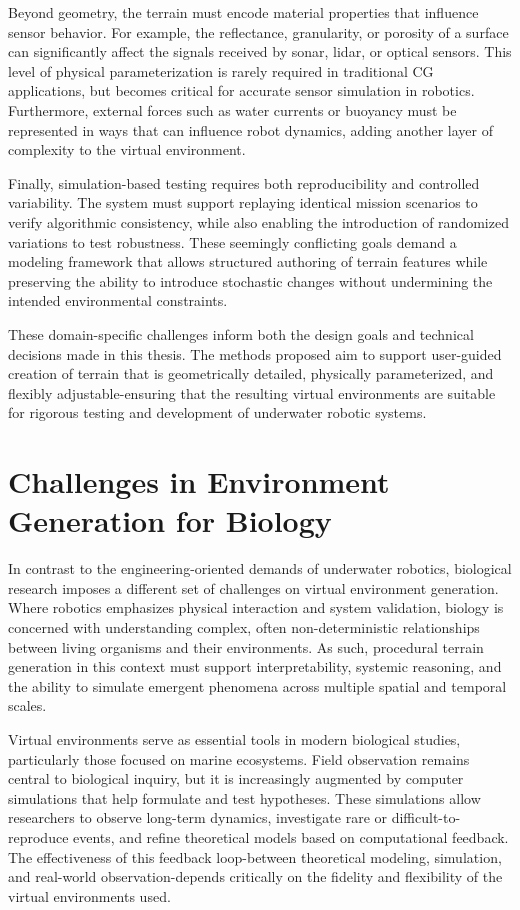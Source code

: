 Beyond geometry, the terrain must encode material properties that influence sensor behavior. For example, the reflectance, granularity, or porosity of a surface can significantly affect the signals received by sonar, lidar, or optical sensors. This level of physical parameterization is rarely required in traditional CG applications, but becomes critical for accurate sensor simulation in robotics. Furthermore, external forces such as water currents or buoyancy must be represented in ways that can influence robot dynamics, adding another layer of complexity to the virtual environment.

Finally, simulation-based testing requires both reproducibility and controlled variability. The system must support replaying identical mission scenarios to verify algorithmic consistency, while also enabling the introduction of randomized variations to test robustness. These seemingly conflicting goals demand a modeling framework that allows structured authoring of terrain features while preserving the ability to introduce stochastic changes without undermining the intended environmental constraints.

These domain-specific challenges inform both the design goals and technical decisions made in this thesis. The methods proposed aim to support user-guided creation of terrain that is geometrically detailed, physically parameterized, and flexibly adjustable-ensuring that the resulting virtual environments are suitable for rigorous testing and development of underwater robotic systems.

\section{Challenges in Environment Generation for Biology}

In contrast to the engineering-oriented demands of underwater robotics, biological research imposes a different set of challenges on virtual environment generation. Where robotics emphasizes physical interaction and system validation, biology is concerned with understanding complex, often non-deterministic relationships between living organisms and their environments. As such, procedural terrain generation in this context must support interpretability, systemic reasoning, and the ability to simulate emergent phenomena across multiple spatial and temporal scales.

Virtual environments serve as essential tools in modern biological studies, particularly those focused on marine ecosystems. Field observation remains central to biological inquiry, but it is increasingly augmented by computer simulations that help formulate and test hypotheses. These simulations allow researchers to observe long-term dynamics, investigate rare or difficult-to-reproduce events, and refine theoretical models based on computational feedback. The effectiveness of this feedback loop-between theoretical modeling, simulation, and real-world observation-depends critically on the fidelity and flexibility of the virtual environments used.

